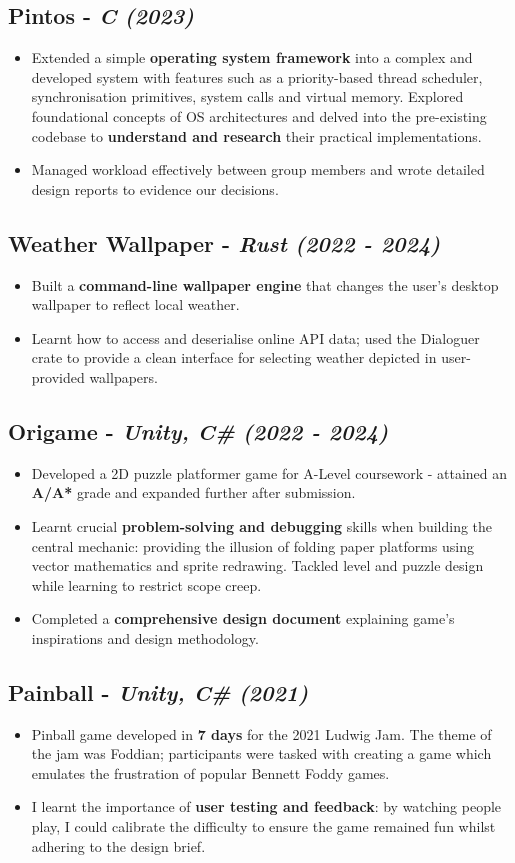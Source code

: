 \documentclass{article}
\newcommand{\dates}[1]{\hfill\textit{(#1)}}
\newcommand{\project}[4]{
    \subsection*{\textbf{#1} - \textit{#3} \dates{#2}}
    \begin{itemize}[topsep=0pt, itemsep=0.05em]
        #4
    \end{itemize}
}
\begin{document}
\project{Pintos }{2023}{C}{
    \item Extended a simple \textbf{operating system framework} into a complex and developed system with features such as a priority-based thread scheduler, 
    synchronisation primitives, system calls and virtual memory. Explored foundational concepts of OS architectures and delved into the
    pre-existing codebase to \textbf{understand and research} their practical implementations. 

    \item Managed workload effectively between group members and wrote detailed design reports to evidence our decisions. 
}

\project{Weather Wallpaper}{2022 - 2024}{Rust}{
    \item Built a \textbf{command-line wallpaper engine} that changes the user's desktop wallpaper to reflect local weather. 

    \item Learnt how to access and deserialise online API data; used the Dialoguer crate to provide a clean interface for selecting weather
    depicted in user-provided wallpapers.
}

\project{Origame}{2022 - 2024}{Unity, C\#}{
    \item Developed a 2D puzzle platformer game for A-Level coursework - attained an \textbf{A/A*} grade
    and expanded further after submission. 

    \item Learnt crucial \textbf{problem-solving and debugging} skills when building the central mechanic: 
    providing the illusion of folding paper platforms using vector mathematics and sprite redrawing.
    Tackled level and puzzle design while learning to restrict scope creep.

    \item Completed a \textbf{comprehensive design document} explaining game's inspirations and design methodology.
}

\project{Painball}{2021}{Unity, C\#}{
    \item Pinball game developed in \textbf{7 days} for the 2021 Ludwig Jam. The theme of the jam was Foddian; 
    participants were tasked with creating a game which emulates the frustration of popular Bennett Foddy games.

    \item I learnt the importance of \textbf{user testing and feedback}: by watching people play, I could calibrate the difficulty
    to ensure the game remained fun whilst adhering to the design brief. 
}
    
\end{document}
